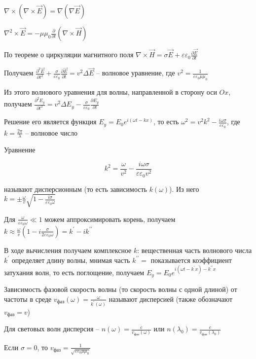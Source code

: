 $\nabla \times (\nabla \times \vec E) = \nabla (\nabla \vec E)$

$\nabla^2 \times \vec E = -\mu\mu_0 \frac{\partial}{\partial t} (\nabla \times \vec H)$

По теореме о циркуляции магнитного поля $\nabla \times \vec H = \sigma \vec E + \varepsilon \varepsilon_0 \frac{\partial \vec E}{\partial t}$

Получаем $\frac{\partial^2 \vec E}{\partial t^2} + \frac{\sigma}{\varepsilon \varepsilon_0} \frac{\partial \vec E}{\partial t} = v^2 \Delta \vec E$ -- волновое уравнение, где $v^2 = \frac{1}{\varepsilon \varepsilon_0 \mu \mu_0}$

Из этого волнового уравнения для волны, направленной в сторону оси $Ox$, получаем $\frac{\partial^2 E_y}{\partial t^2} = v^2 \Delta E_y - \frac{\sigma}{\varepsilon \varepsilon_0} \frac{\partial E_y}{\partial t}$

Решение его является функция $E_y = E_0 e^{i (\omega t - k x)}$, то есть $\omega^2 = v^2 k^2 - \frac{i \omega \sigma}{\varepsilon \varepsilon_0}$, где $k = \frac{2\pi}{\lambda}$ -- волновое число

Уравнение 

\[k^2 = \frac{\omega}{v^2} - \frac{i \omega \sigma}{\varepsilon \varepsilon_0 v^2}\]

называют дисперсионным (то есть зависимость $k(\omega)$). Из него $k = \pm \frac{\omega}{v} \sqrt{1 - \frac{i \sigma}{\varepsilon \varepsilon_0 \omega}}$

Для $\frac{\omega}{\varepsilon\varepsilon_0 \omega} \ll 1$ можем аппроксимировать корень, получаем $k \approx \frac{\omega}{v} \left(1 - i \frac{\sigma}{2\varepsilon\varepsilon_0 \omega}\right) = k^\prime - i k^{\prime\prime}$

В ходе вычисления получаем комплексное $k$: вещественная часть волнового числа $k^\prime$ определяет длину волны, мнимая часть $k^{\prime\prime} = $ показывается коэффициент затухания волн, то есть поглощение, получаем $E_y = E_0 e^{i (\omega t - k^{\prime} x) - k^{\prime\prime} x}$

Зависимость фазовой скорость волны (то скорость волны с одной длиной) от частоты в среде $v_\text{фаз}(\omega) = \frac{\omega}{k^{\prime}(\omega)}$ называют дисперсией (также обозначают $v_{\text{фаз}} = v$)

Для световых волн дисперсия -- $n(\omega) = \frac{c}{v_{\text{фаз}}(\omega)}$ или $n(\lambda_0) = \frac{c}{v_{\text{фаз}}(\lambda_0)}$

Если $\sigma = 0$, то $v_{\text{фаз}} = \frac{1}{\sqrt{\varepsilon \varepsilon_0 \mu \mu_0}}$

